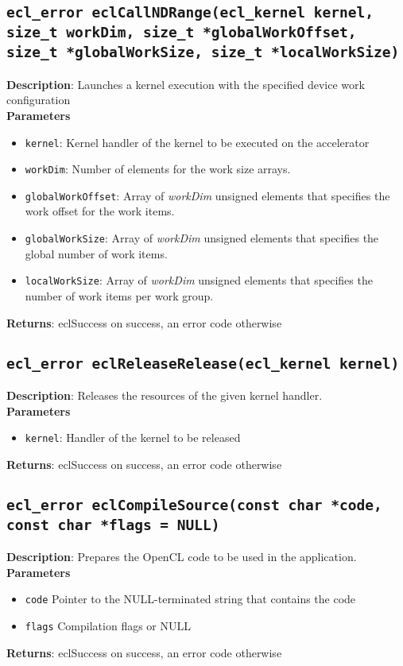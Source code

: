 \subsection{\texttt{ecl\_error eclCallNDRange(ecl\_kernel kernel, size\_t workDim, size\_t 
*globalWorkOffset, size\_t *globalWorkSize, size\_t *localWorkSize)}}

\textbf{Description}: Launches a kernel execution with the specified device work configuration\\
\textbf{Parameters}
\begin{itemize}
  \item \texttt{kernel}: Kernel handler of the kernel to be executed on the accelerator
  \item \texttt{workDim}: Number of elements for the work size arrays.
  \item \texttt{globalWorkOffset}: Array of \emph{workDim} unsigned elements that specifies the work 
    offset for the work items.
  \item \texttt{globalWorkSize}: Array of \emph{workDim} unsigned elements that specifies the global 
    number of work items.
  \item \texttt{localWorkSize}: Array of \emph{workDim} unsigned elements that specifies the number 
    of work items per work group.
\end{itemize}
\textbf{Returns}: eclSuccess on success, an error code otherwise

\subsection{\texttt{ecl\_error eclReleaseRelease(ecl\_kernel kernel)}}

\textbf{Description}: Releases the resources of the given kernel handler. \\
\textbf{Parameters}
\begin{itemize}
  \item \texttt{kernel}: Handler of the kernel to be released
\end{itemize}
\textbf{Returns}: eclSuccess on success, an error code otherwise


\subsection{\texttt{ecl\_error eclCompileSource(const char *code, const char *flags = NULL)}}

\textbf{Description}: Prepares the OpenCL code to be used in the application. \\
\textbf{Parameters}
\begin{itemize}
  \item \texttt{code} Pointer to the NULL\hyp{}terminated string that contains the code
  \item \texttt{flags} Compilation flags or NULL
\end{itemize}
\textbf{Returns}: eclSuccess on success, an error code otherwise

